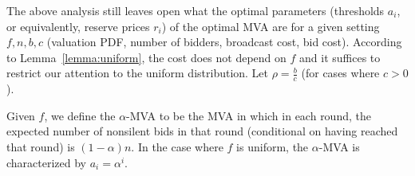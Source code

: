 The above analysis still leaves open what the optimal parameters
(thresholds $a_i$, or equivalently, reserve prices $r_i$) of the optimal
MVA are for a given setting $f, n, b, c$ (valuation PDF, number of bidders,
broadcast cost, bid cost).  According to Lemma~\ref{lemma:uniform}, the
cost does not depend on $f$ and it suffices to restrict our attention to
the uniform distribution.
Let $\rho = \frac{b}{c}$ (for cases where $c>0$).


\begin{definition}
Given $f$, we define the $\alpha$-MVA to be the MVA in which in each round, the expected
number of nonsilent bids in that round (conditional on having reached that
round) is $(1-\alpha)n$.  In the case where $f$ is uniform, the
$\alpha$-MVA is characterized by $a_i = \alpha^i$.
\end{definition}

